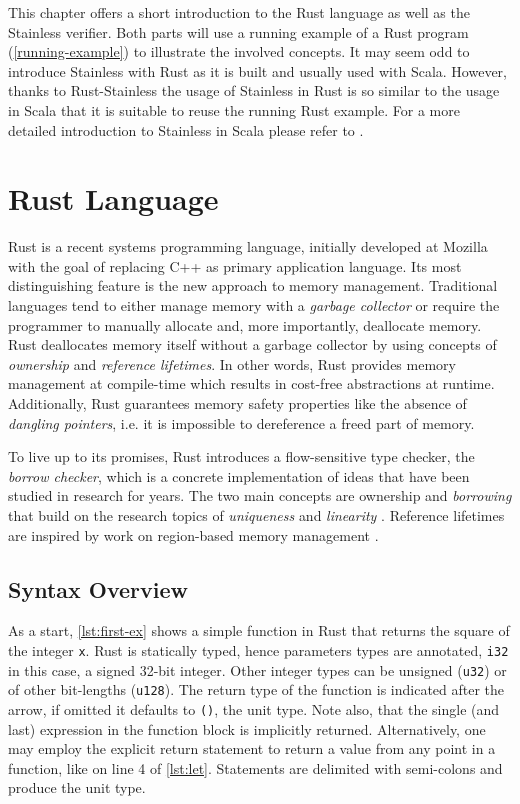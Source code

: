 This chapter offers a short introduction to the Rust language as well as the
Stainless verifier. Both parts will use a running example of a Rust program
(\autoref{running-example}) to illustrate the involved concepts. It may seem odd
to introduce Stainless with Rust  as it is built and usually used with Scala.
However, thanks to Rust-Stainless the  usage of Stainless in Rust is so similar
to the usage in Scala that it is suitable  to reuse the running Rust example.
For a more detailed introduction to Stainless in Scala please refer to
\cite{stainless-doc}.

\section{Rust Language}

Rust \cite{rust2, rust1} is a recent systems programming language, initially
developed at Mozilla with the goal of replacing C++ as primary application
language. Its most distinguishing feature is the new approach to memory
management. Traditional languages tend to either manage memory with a
\emph{garbage collector} or require the programmer to manually allocate and,
more importantly, deallocate memory. Rust deallocates memory itself without a
garbage collector by using concepts of \emph{ownership} and \emph{reference
lifetimes}. In other words, Rust provides memory management at compile-time
which results in cost-free abstractions at runtime. Additionally, Rust
guarantees memory safety properties like  the absence of \emph{dangling
pointers}, i.e. it is impossible to dereference a freed part of memory.

To live up to its promises, Rust introduces a flow-sensitive type checker, the
\emph{borrow checker}, which is a concrete implementation of ideas that have
been studied in research for years. The two main concepts are ownership
\cite{ownership-types} and \emph{borrowing} that build on the research topics of
\emph{uniqueness} \cite{alias-burying} and \emph{linearity}
\cite{Wadler90lineartypes, once-upon-a-type}. Reference lifetimes are inspired
by work on region-based memory management \cite{cyclone-region}.


\subsection{Syntax Overview}

As a start, \autoref{lst:first-ex} shows a simple function in Rust that returns
the square of the integer \lstinline!x!. Rust is statically typed, hence
parameters types are annotated, \lstinline!i32! in this case, a signed 32-bit
integer. Other integer types can be unsigned (\lstinline!u32!) or of other
bit-lengths (\lstinline!u128!). The return type of the function is indicated
after the arrow, if omitted it defaults to \lstinline!()!, the unit type. Note
also, that the single (and last) expression in the function block is implicitly
returned. Alternatively, one may employ the explicit return statement to return
a value from any point in a function, like on line 4 of \autoref{lst:let}.
Statements are delimited with semi-colons and produce the unit type.

